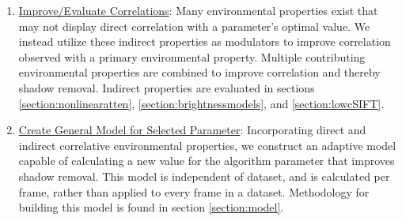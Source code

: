\begin{enumerate}
\item \underline{Improve/Evaluate Correlations}: Many environmental properties exist that may not display direct correlation with a parameter's optimal value. We instead utilize these indirect properties as modulators to improve correlation observed with a primary environmental property. Multiple contributing environmental properties are combined to improve correlation and thereby shadow removal. Indirect properties are evaluated in sections \ref{section:nonlinearatten}, \ref{section:brightnessmodels}, and \ref{section:lowcSIFT}.

\item \underline{Create General Model for Selected Parameter}: Incorporating direct and indirect correlative environmental properties, we construct an adaptive model capable of calculating a new value for the algorithm parameter that improves shadow removal. This model is independent of dataset, and is calculated per frame, rather than applied to every frame in a dataset. Methodology for building this model is found in section \ref{section:model}.
\end{enumerate}